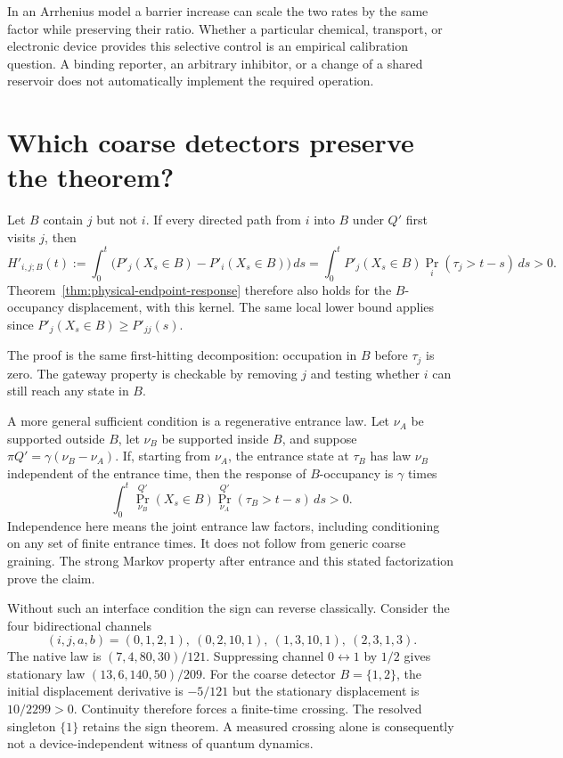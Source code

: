 In an Arrhenius model a barrier increase can scale the two rates by
the same factor while preserving their ratio.  Whether a particular
chemical, transport, or electronic device provides this selective
control is an empirical calibration question.  A binding reporter,
an arbitrary inhibitor, or a change of a shared reservoir does not
automatically implement the required operation.

\section{Which coarse detectors preserve the theorem?}

\begin{corollary}
\label{cor:physical-gateway}
Let $B$ contain $j$ but not $i$.  If every directed path from $i$ into
$B$ under $Q'$ first visits $j$, then
\[
 H'_{i,j;B}(t):=\int_0^t
     \bigl(P'_j(X_s\in B)-P'_i(X_s\in B)\bigr)\,ds
 =\int_0^tP'_j(X_s\in B)\Pr_i(\tau_j>t-s)\,ds>0.
\]
Theorem~\ref{thm:physical-endpoint-response} therefore also holds for
the $B$-occupancy displacement, with this kernel.  The same local
lower bound applies since $P'_j(X_s\in B)\ge P'_{jj}(s)$.
\end{corollary}

The proof is the same first-hitting decomposition: occupation in $B$
before $\tau_j$ is zero.  The gateway property is checkable by removing
$j$ and testing whether $i$ can still reach any state in $B$.

A more general sufficient condition is a regenerative entrance law.
Let $\nu_A$ be supported outside $B$, let $\nu_B$ be supported inside
$B$, and suppose
$\pi Q'=\gamma(\nu_B-\nu_A)$.
If, starting from $\nu_A$, the entrance state at $\tau_B$ has law
$\nu_B$ independent of the entrance time, then the response of
$B$-occupancy is $\gamma$ times
\[
 \int_0^t\Pr_{\nu_B}^{Q'}(X_s\in B)
             \Pr_{\nu_A}^{Q'}(\tau_B>t-s)\,ds>0.
\]
Independence here means the joint entrance law factors, including
conditioning on any set of finite entrance times.  It does not follow
from generic coarse graining.  The strong Markov property after
entrance and this stated factorization prove the claim.

Without such an interface condition the sign can reverse classically.
Consider the four bidirectional channels
\[
 (i,j,a,b)=(0,1,2,1),\ (0,2,10,1),\ (1,3,10,1),\ (2,3,1,3).
\]
The native law is $(7,4,80,30)/121$.  Suppressing channel $0\leftrightarrow1$
by $1/2$ gives stationary law $(13,6,140,50)/209$.
For the coarse detector $B=\{1,2\}$, the initial displacement derivative
is $-5/121$ but the stationary displacement is $10/2299>0$.
Continuity therefore forces a finite-time crossing.  The resolved
singleton $\{1\}$ retains the sign theorem.  A measured crossing alone
is consequently not a device-independent witness of quantum dynamics.

